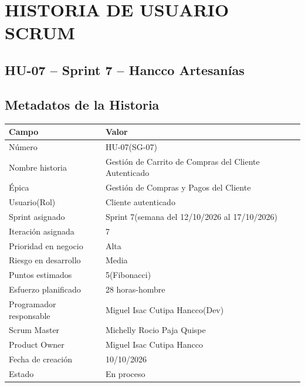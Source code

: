 \documentclass[12pt,a4paper]{article}
\begin{document}
\thispagestyle{fancy}

\section*{HISTORIA DE USUARIO SCRUM}

\subsection*{HU-07 -- Sprint 7 -- Hancco Artesanías}

\subsection*{Metadatos de la Historia}

\begin{center}
\small
\begin{tabularx}{\textwidth}{p{4.5cm} L}
\toprule
\textbf{Campo} & \textbf{Valor} \\
\midrule
Número & HU-07(SG-07) \\
Nombre historia & Gestión de Carrito de Compras del Cliente Autenticado \\
Épica & Gestión de Compras y Pagos del Cliente \\
Usuario(Rol) & Cliente autenticado \\
Sprint asignado & Sprint 7(semana del 12/10/2026 al 17/10/2026) \\
Iteración asignada & 7 \\
Prioridad en negocio & Alta \\
Riesgo en desarrollo & Media \\
Puntos estimados & 5(Fibonacci) \\
Esfuerzo planificado & 28 horas-hombre \\
Programador responsable & Miguel Isac Cutipa Hancco(Dev) \\
Scrum Master & Michelly Rocio Paja Quispe \\
Product Owner & Miguel Isac Cutipa Hancco \\
Fecha de creación & 10/10/2026 \\
Estado & En proceso \\
\bottomrule
\end{tabularx}
\end{center}

\end{document}
